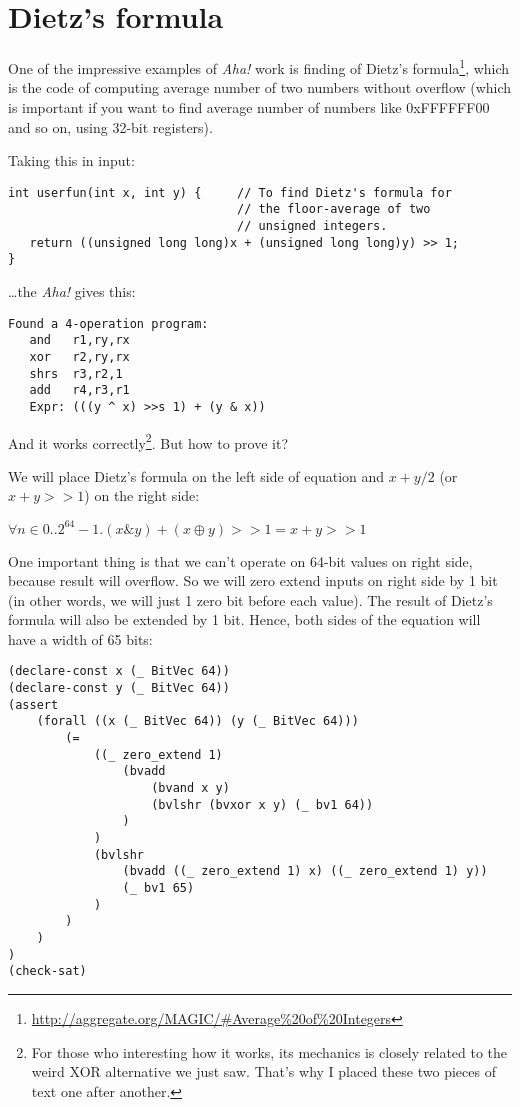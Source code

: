 \section{Dietz's formula}
\label{Dietz}

One of the impressive examples of \textit{Aha!} work is finding of Dietz's formula\footnote{\url{http://aggregate.org/MAGIC/\#Average\%20of\%20Integers}},
which is the code of computing average number of two numbers without overflow (which is important if you want to find average number of numbers like 0xFFFFFF00 and so on, using 32-bit registers).

Taking this in input:

\begin{lstlisting}
int userfun(int x, int y) {     // To find Dietz's formula for
                                // the floor-average of two
                                // unsigned integers.
   return ((unsigned long long)x + (unsigned long long)y) >> 1;
}
\end{lstlisting}

\dots the \textit{Aha!} gives this:

\begin{lstlisting}
Found a 4-operation program:
   and   r1,ry,rx
   xor   r2,ry,rx
   shrs  r3,r2,1
   add   r4,r3,r1
   Expr: (((y ^ x) >>s 1) + (y & x))
\end{lstlisting}

And it works correctly\footnote{For those who interesting how it works,
its mechanics is closely related to the weird XOR alternative we just saw.
That's why I placed these two pieces of text one after another.}.
But how to prove it?

We will place Dietz's formula on the left side of equation and $x+y/2$ (or $x+y>>1$) on the right side:

\begin{center}
$\forall n \in 0..2^{64}-1 . (x\&y) + (x \oplus y)>>1 = x+y>>1$
\end{center}

One important thing is that we can't operate on 64-bit values on right side, because result will overflow.
So we will zero extend inputs on right side by 1 bit (in other words, we will just 1 zero bit before each value).
The result of Dietz's formula will also be extended by 1 bit.
Hence, both sides of the equation will have a width of 65 bits:

\begin{lstlisting}
(declare-const x (_ BitVec 64))
(declare-const y (_ BitVec 64))
(assert 
	(forall ((x (_ BitVec 64)) (y (_ BitVec 64)))
		(=
			((_ zero_extend 1)
				(bvadd
					(bvand x y)
					(bvlshr (bvxor x y) (_ bv1 64))
				)
			)
			(bvlshr
				(bvadd ((_ zero_extend 1) x) ((_ zero_extend 1) y))
				(_ bv1 65)
			)
		)
	)
)
(check-sat)
\end{lstlisting}


